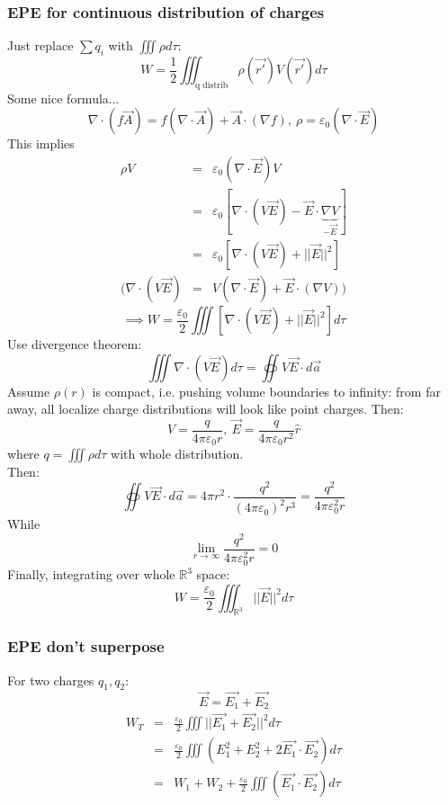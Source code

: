 \documentclass[12pt,a4paper,twoside]{article}
\begin{document}
\subsubsection{EPE for continuous distribution of charges}
    Just replace $\sum q_i$ with $\iiint \rho d\tau$:
    \begin{equation}
        W=\frac{1}{2}\iiint_{\textrm{q distrib}} \rho(\overrightarrow{r'})V(\overrightarrow{r'})d\tau
    \end{equation}
    Some nice formula...
    \[\nabla \cdot(f\overrightarrow{A})=f(\nabla\cdot \overrightarrow{A})+\overrightarrow{A}\cdot (\nabla f),\ \rho =\varepsilon_0(\nabla \cdot \overrightarrow{E})\]
    This implies
    \begin{eqnarray*}
        \rho V &=& \varepsilon_0 (\nabla \cdot \overrightarrow{E})V\\
        &=& \varepsilon_0[\nabla \cdot(V\overrightarrow{E})-\overrightarrow{E}\cdot\underbrace{\nabla V}_{-\overrightarrow{E}}]\\
        &=& \varepsilon_0[\nabla\cdot (V\overrightarrow{E})+||\overrightarrow{E}||^2]\\
        (\nabla\cdot(V\overrightarrow{E})&=& V(\nabla \cdot \overrightarrow{E})+\overrightarrow{E}\cdot(\nabla V))
    \end{eqnarray*}
    \[\implies W= \frac{\varepsilon_0}{2}\iiint[\nabla\cdot (V\overrightarrow{E})+||\overrightarrow{E}||^2]d\tau\]
    Use divergence theorem:
    \[\iiint \nabla \cdot (V\overrightarrow{E})d\tau=\oiint V\overrightarrow{E}\cdot d\overrightarrow{a}\]
    Assume $\rho(r)$ is compact, i.e. pushing volume boundaries to infinity: from far away, all localize charge distributions will look like point charges. Then:
    \[V=\frac{q}{4\pi\varepsilon_0 r},\ \overrightarrow{E}=\frac{q}{4\pi\varepsilon_0 r^2}\hat{r}\]
    where $q=\iiint \rho d\tau$ with whole distribution.\\
    \noindent Then:
    \[\oiint V\overrightarrow{E}\cdot d\overrightarrow{a}=4\pi r^2\cdot \frac{q^2}{(4\pi \varepsilon_0)^2r^3}=\frac{q^2}{4\pi\varepsilon_0^2 r}\]
    While
    \[\lim_{r\to\infty}\frac{q^2}{4\pi\varepsilon_0^2 r}=0\]
    Finally, integrating over whole $\mathbb{R}^3$ space:
    \[W=\frac{\varepsilon_0}{2}\iiint_{\mathbb{R}^3}||\overrightarrow{E}||^2d\tau\]
\subsubsection{EPE don't superpose}
    For two charges $q_1, q_2$:
        \[\overrightarrow{E} = \overrightarrow{E_1}+\overrightarrow{E_2}\]
        \begin{eqnarray*}
        W_T &=& \frac{\varepsilon_0}{2}\iiint ||\overrightarrow{E_1}+\overrightarrow{E_2}||^2d\tau\\
        &=& \frac{\varepsilon_0}{2}\iiint(E_1^2+E_2^2+2\overrightarrow{E_1}\cdot \overrightarrow{E_2})d\tau\\
        &=& W_1+W_2+\frac{\varepsilon_0}{2}\iiint (\overrightarrow{E_1}\cdot\overrightarrow{E_2})d\tau
        \end{eqnarray*}
\end{document}
